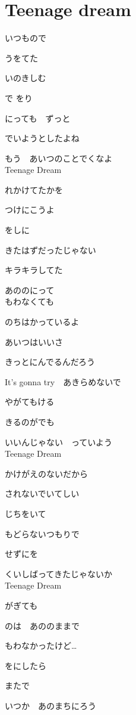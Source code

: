 \section{ Teenage dream}
\large{

いつもので

うをてた

いのきしむ

で をり

にっても　ずっと

でいようとしたよね

もう　あいつのことでくなよ
\\

Teenage Dream

れかけてたかを

つけにこうよ

をしに

きたはずだったじゃない

キラキラしてた

あののにって
\\

もわなくても

のちはかっているよ

あいつはいいさ

きっとにんでるんだろう

It's gonna try　あきらめないで

やがてもける

きるのがでも

いいんじゃない　っていよう
\\

Teenage Dream

かけがえのないだから

されないでいてしい

じちをいて

もどらないつもりで

せずにを

くいしばってきたじゃないか
\\

Teenage Dream

がぎても

のは　あののままで

もわなかったけど…

をにしたら

またで

いつか　あのまちにろう

}